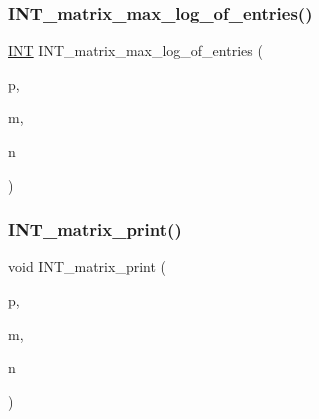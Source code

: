 \mbox{\label{util_8_c_a9b3996eef7bcd41491b2179ff40beeca}} 
\subsubsection{\texorpdfstring{I\+N\+T\+\_\+matrix\+\_\+max\+\_\+log\+\_\+of\+\_\+entries()}{INT\_matrix\_max\_log\_of\_entries()}}
{\footnotesize\ttfamily \mbox{\hyperlink{galois_8h_a09fddde158a3a20bd2dcadb609de11dc}{I\+NT}} I\+N\+T\+\_\+matrix\+\_\+max\+\_\+log\+\_\+of\+\_\+entries (\begin{DoxyParamCaption}\item[{\mbox{\hyperlink{galois_8h_a09fddde158a3a20bd2dcadb609de11dc}{I\+NT}} $\ast$}]{p,  }\item[{\mbox{\hyperlink{galois_8h_a09fddde158a3a20bd2dcadb609de11dc}{I\+NT}}}]{m,  }\item[{\mbox{\hyperlink{galois_8h_a09fddde158a3a20bd2dcadb609de11dc}{I\+NT}}}]{n }\end{DoxyParamCaption})}

\mbox{\label{util_8_c_afd4180a24bef3a2b584668a4eaf607ff}} 
\subsubsection{\texorpdfstring{I\+N\+T\+\_\+matrix\+\_\+print()}{INT\_matrix\_print()}\hspace{0.1cm}{\footnotesize\ttfamily [1/2]}}
{\footnotesize\ttfamily void I\+N\+T\+\_\+matrix\+\_\+print (\begin{DoxyParamCaption}\item[{\mbox{\hyperlink{galois_8h_a09fddde158a3a20bd2dcadb609de11dc}{I\+NT}} $\ast$}]{p,  }\item[{\mbox{\hyperlink{galois_8h_a09fddde158a3a20bd2dcadb609de11dc}{I\+NT}}}]{m,  }\item[{\mbox{\hyperlink{galois_8h_a09fddde158a3a20bd2dcadb609de11dc}{I\+NT}}}]{n }\end{DoxyParamCaption})}

